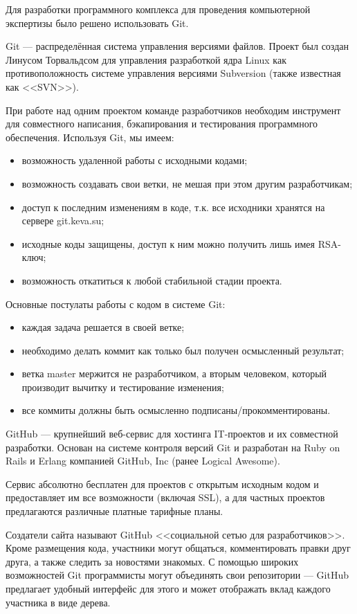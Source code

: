 Для разработки программного комплекса для проведения компьютерной экспертизы было решено использовать Git.

Git --- распределённая система управления версиями файлов. Проект был создан Линусом Торвальдсом для управления разработкой ядра Linux  как противоположность  системе управления версиями Subversion (также известная как <<SVN>>). \cite{progit}

При работе над одним проектом команде разработчиков необходим инструмент для совместного написания, бэкапирования и тестирования программного обеспечения. Используя Git, мы имеем:
\begin{itemize}
\item возможность удаленной работы с исходными кодами;
\item возможность создавать свои ветки, не мешая при этом другим разработчикам;
\item доступ к последним изменениям в коде, т.к. все исходники хранятся на сервере git.keva.su;
\item исходные коды защищены, доступ к ним можно получить лишь имея RSA-ключ;
\item возможность откатиться к любой стабильной стадии проекта.
\end{itemize}

Основные постулаты работы с кодом в системе Git:

\begin{itemize}
\item каждая задача решается в своей ветке;
\item необходимо делать коммит как только был получен осмысленный результат;
\item ветка master мержится не разработчиком, а вторым человеком, который производит вычитку и тестирование изменения;
\item все коммиты должны быть осмысленно подписаны/прокомментированы.
\end{itemize}

GitHub ---  крупнейший веб-сервис для хостинга IT-проектов и их совместной разработки. Основан на системе контроля версий Git и разработан на Ruby on Rails и Erlang компанией GitHub, Inc (ранее Logical Awesome).

Сервис абсолютно бесплатен для проектов с открытым исходным кодом и предоставляет им все возможности (включая SSL), а для частных проектов предлагаются различные платные тарифные планы.\cite{github} 

Создатели сайта называют GitHub <<социальной сетью для разработчиков>>. Кроме размещения кода, участники могут общаться, комментировать правки друг друга, а также следить за новостями знакомых. С помощью широких возможностей Git программисты могут объединять свои репозитории — GitHub предлагает удобный интерфейс для этого и может отображать вклад каждого участника в виде дерева.

